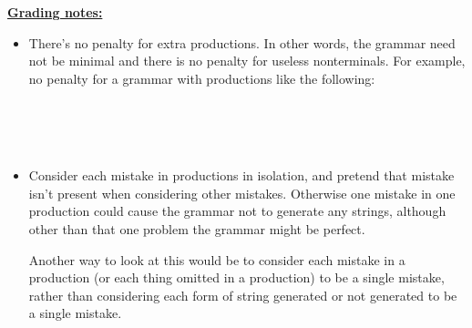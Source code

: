 \documentclass[11pt,fleqn]{article}
\newcommand{\terminal}[1]{\texttt{#1}}
\begin{document}
\begin{enumerate}
\begin{info}{\textbf{\underline{Grading notes:}}}
\begin{itemize}
              \item There's no penalty for extra productions.  In
                    other words, the grammar need not be minimal and
                    there is no penalty for useless nonterminals.
                    For example, no penalty for a grammar with
                    productions like the following:

                    \smallskip

                    \begin{centering}

                      \begin{grammar}[1.25]
                          \\
                        \production{Lparen}{\terminal{(}}
                          \\
                        \production{Rparen}{\terminal{)}}
                          \\
                      \end{grammar}

                    \end{centering}

                    \smallskip

              \item Consider each mistake in productions in
                    isolation, and pretend that mistake isn't
                    present when considering other mistakes.
                    Otherwise one mistake in one production could
                    cause the grammar not to generate any strings,
                    although other than that one problem the grammar
                    might be perfect.

                    Another way to look at this would be to consider
                    each mistake in a production (or each thing
                    omitted in a production) to be a single mistake,
                    rather than considering each form of string
                    generated or not generated to be a single
                    mistake.

              \end{itemize}

          \end{info}

          \pagebreak



\end{enumerate}
\end{document}
